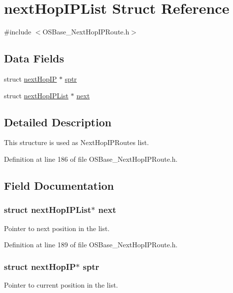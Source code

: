 \hypertarget{structnext_hop_i_p_list}{
\section{nextHopIPList Struct Reference}
\label{structnext_hop_i_p_list}
}


{\ttfamily \#include $<$OSBase\_\-NextHopIPRoute.h$>$}\subsection*{Data Fields}
\begin{DoxyCompactItemize}
\item 
struct \hyperlink{structnext_hop_i_p}{nextHopIP} $\ast$ \hyperlink{structnext_hop_i_p_list_aafe2286d435d5797b1e01a566b8f32ef}{sptr}
\item 
struct \hyperlink{structnext_hop_i_p_list}{nextHopIPList} $\ast$ \hyperlink{structnext_hop_i_p_list_a2b8d377d6b5a5f0ec21056dabdefb3dd}{next}
\end{DoxyCompactItemize}


\subsection{Detailed Description}
This structure is used as NextHopIPRoutes list. 

Definition at line 186 of file OSBase\_\-NextHopIPRoute.h.

\subsection{Field Documentation}
\hypertarget{structnext_hop_i_p_list_a2b8d377d6b5a5f0ec21056dabdefb3dd}{
\subsubsection[{next}]{\setlength{\rightskip}{0pt plus 5cm}struct {\bf nextHopIPList}$\ast$ {\bf next}}}
\label{structnext_hop_i_p_list_a2b8d377d6b5a5f0ec21056dabdefb3dd}
Pointer to next position in the list. 

Definition at line 189 of file OSBase\_\-NextHopIPRoute.h.\hypertarget{structnext_hop_i_p_list_aafe2286d435d5797b1e01a566b8f32ef}{
\subsubsection[{sptr}]{\setlength{\rightskip}{0pt plus 5cm}struct {\bf nextHopIP}$\ast$ {\bf sptr}}}
\label{structnext_hop_i_p_list_aafe2286d435d5797b1e01a566b8f32ef}
Pointer to current position in the list. 

